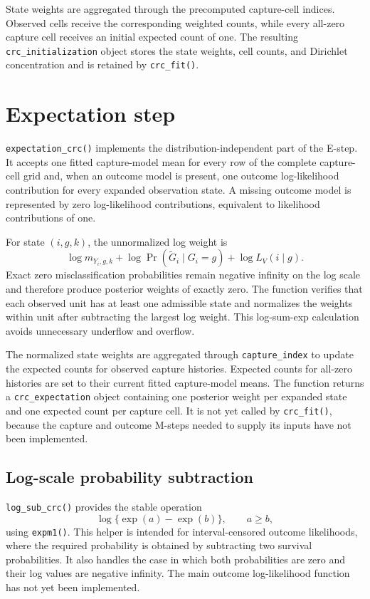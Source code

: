 \documentclass[11pt,letterpaper]{article}
\begin{document}
State weights are aggregated through the precomputed capture-cell indices.
Observed cells receive the corresponding weighted counts, while every
all-zero capture cell receives an initial expected count of one. The resulting
\texttt{crc\_initialization} object stores the state weights, cell counts, and
Dirichlet concentration and is retained by \texttt{crc\_fit()}.

\section{Expectation step}

\texttt{expectation\_crc()} implements the distribution-independent part of
the E-step. It accepts one fitted capture-model mean for every row of the
complete capture-cell grid and, when an outcome model is present, one outcome
log-likelihood contribution for every expanded observation state. A missing
outcome model is represented by zero log-likelihood contributions, equivalent
to likelihood contributions of one.

For state $(i,g,k)$, the unnormalized log weight is
\[
  \log m_{Y_i,g,k}
  + \log \Pr(\widetilde G_i\mid G_i=g)
  + \log L_V(i\mid g).
\]
Exact zero misclassification probabilities remain negative infinity on the
log scale and therefore produce posterior weights of exactly zero. The
function verifies that each observed unit has at least one admissible state
and normalizes the weights within unit after subtracting the largest log
weight. This log-sum-exp calculation avoids unnecessary underflow and
overflow.

The normalized state weights are aggregated through \texttt{capture\_index}
to update the expected counts for observed capture histories. Expected counts
for all-zero histories are set to their current fitted capture-model means.
The function returns a \texttt{crc\_expectation} object containing one
posterior weight per expanded state and one expected count per capture cell.
It is not yet called by \texttt{crc\_fit()}, because the capture and outcome
M-steps needed to supply its inputs have not been implemented.

\subsection{Log-scale probability subtraction}

\texttt{log\_sub\_crc()} provides the stable operation
\[
  \log\{\exp(a)-\exp(b)\}, \qquad a\geq b,
\]
using \texttt{expm1()}. This helper is intended for interval-censored outcome
likelihoods, where the required probability is obtained by subtracting two
survival probabilities. It also handles the case in which both probabilities
are zero and their log values are negative infinity. The main outcome
log-likelihood function has not yet been implemented.
\end{document}
